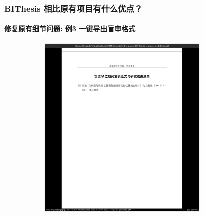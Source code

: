 \documentclass[
  aspectratio=169,
  presentation,
  titlegraphic=./images/bit.png,
  framelogo=./images/bit.png
]{bitbeamer}
\begin{document}
\begin{frame}[t]
\begin{figure}
\begin{subfigure}{0.45\textwidth}
    \end{subfigure}
  \end{figure}
\end{frame}



\begin{frame}[t]
  \frametitle{BIThesis 相比原有项目有什么优点？}
  \framesubtitle{修复原有细节问题: 例3 一键导出盲审格式}

  \vspace{-0.8cm}

  \begin{figure}
    \begin{subfigure}{0.45\textwidth}
      \includegraphics[width=0.9\textwidth]{images/7-1.png}
    \end{subfigure}
    \begin{subfigure}{0.45\textwidth}

\end{subfigure}
\end{figure}
\end{frame}
\end{document}
